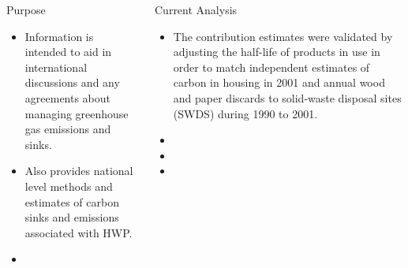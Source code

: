 \documentclass[final]{beamer}\usepackage[]{graphicx}\usepackage[]{color}
\newlength{\onecolwid}
\newlength{\twocolwid}
\begin{document}
\begin{frame}[t]
\begin{columns}[t]
\begin{column}{\twocolwid}
\begin{columns}[t,totalwidth=\twocolwid]
\begin{column}{\onecolwid}
\begin{block}{Purpose}
\vspace{0ex}
\begin{itemize}
\item Information is intended to aid in international discussions and any agreements about managing greenhouse gas emissions and sinks.
\item Also provides national level methods and estimates of carbon sinks and emissions associated with HWP.
\item
\end{itemize}
\vspace{-1.5ex}
\end{block}


\end{column} %

\begin{column}{\onecolwid}\vspace{-.6in} %


\begin{block}{Current Analysis}
\vspace{0ex}
\begin{itemize}
\item The contribution estimates were validated by adjusting the half-life of products in use in order to match independent estimates of carbon in housing in 2001 and annual wood and paper discards to solid-waste disposal sites (SWDS) during 1990 to 2001. 
\item
\item
\item
\end{itemize}
\end{block}


\end{column} %

\end{columns} %


\end{column}
\end{columns}
\end{frame}
\end{document}
